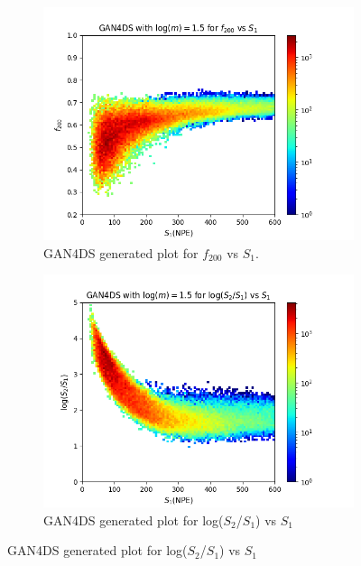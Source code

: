 \documentclass[11pt]{article} %
\begin{document}
\begin{figure}[H]
\begin{minipage}{\textwidth}
\end{minipage}
\begin{minipage}{\textwidth}
  \begin{subfigure}{.5\textwidth}
      \centering\captionsetup{width=.9\linewidth}%
      \includegraphics[scale=0.6]{./images/1.5/gan_f200_vs_s1.png}
      \caption{GAN4DS generated plot for $f_{200}$ vs $S_1$.}
  \end{subfigure}
  \begin{subfigure}{.5\textwidth}
      \centering\captionsetup{width=.9\linewidth}%
      \includegraphics[scale=0.6]{./images/1.5/gan_s1_over_s2_vs_s1.png}
      \caption{GAN4DS generated plot for log($S_2$/$S_1$) vs $S_1$}
  \end{subfigure}

\end{minipage}
\end{figure}
\end{document}
